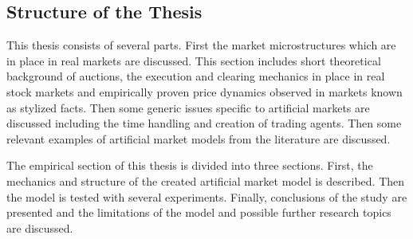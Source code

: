 \subsection{Structure of the Thesis}
This thesis consists of several parts. First the market microstructures which are in place in real 
markets are discussed. This section includes short theoretical background of auctions, the execution and clearing mechanics in place in real
stock markets and empirically proven price dynamics observed in markets known as stylized
facts. Then some generic issues specific to artificial markets are discussed including the time handling and creation
of trading agents. Then some relevant examples of artificial market models from the literature are discussed. 

The empirical section of this thesis is divided into three sections. First, the mechanics and
structure of the created artificial market model is described. Then the model is tested
with several experiments. Finally, conclusions of the study are presented and the limitations of the model and
possible further research topics are discussed.